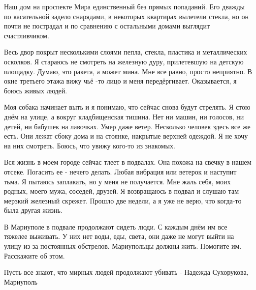 Наш дом на проспекте Мира единственный без прямых попаданий. Его дважды по
касательной задело снарядами, в некоторых квартирах вылетели стекла, но он
почти не пострадал и по сравнению с остальными домами выглядит счастливчиком. 

Весь двор покрыт несколькими слоями пепла, стекла, пластика и металлических
осколков. Я стараюсь не смотреть на железную  дуру,  прилетевшую  на детскую
площадку. Думаю, это ракета, а может  мина.  Мне все равно,  просто неприятно.
В окне третьего этажа вижу чьё -то лицо и меня передёргивает. Оказывается, я
боюсь живых людей. 

Моя собака начинает выть и я понимаю, что сейчас  снова будут  стрелять. Я стою
днём на улице, а вокруг кладбищенская тишина. Нет ни машин, ни голосов, ни
детей, ни бабушек на лавочках. Умер даже ветер. Несколько человек здесь все же
есть. Они лежат сбоку дома и на стоянке, накрытые верхней одеждой. Я не хочу на
них смотреть. Боюсь, что увижу кого-то из знакомых. 

Вся жизнь в моем городе сейчас тлеет в подвалах. Она похожа на свечку в нашем
отсеке. Погасить ее - нечего делать. Любая вибрация или ветерок и наступит
тьма. Я пытаюсь  заплакать, но у меня не получается.  Мне жаль себя, моих
родных, моего мужа, соседей, друзей. Я возвращаюсь в подвал и слушаю там
мерзкий железный скрежет. Прошло две недели, а я уже не верю, что когда-то была
другая жизнь. 

В Мариуполе в подвале продолжают сидеть люди. С каждым днём им все тяжелее
выживать. У них нет воды, еды, света, они даже не могут выйти на улицу из-за
постоянных обстрелов. Мариупольцы должны жить. Помогите им. Расскажите об этом.

Пусть все знают, что мирных людей продолжают  убивать - Надежда Сухорукова,
Мариуполь
